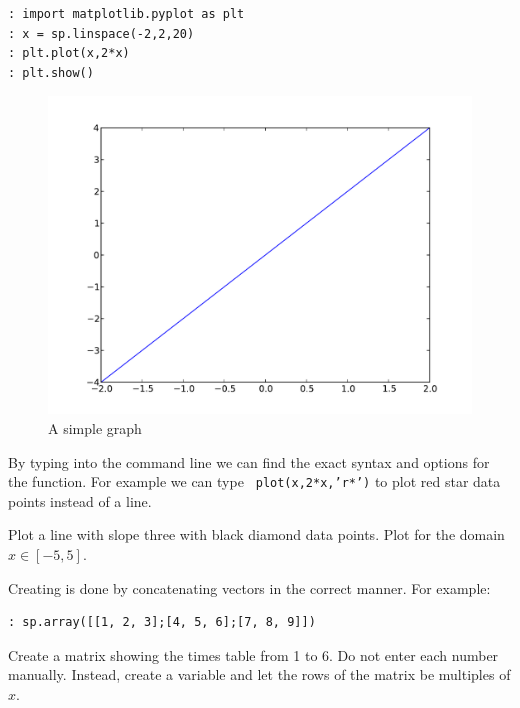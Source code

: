 \begin{lstlisting}
: import matplotlib.pyplot as plt
: x = sp.linspace(-2,2,20)
: plt.plot(x,2*x)
: plt.show()    
\end{lstlisting}

\begin{figure}
\begin{center}
        \includegraphics[scale=0.5]{./Figures/graph.pdf}
        \caption{A simple graph}
\end{center}
\end{figure}

By typing  into the command line we can find the exact syntax and
options for the  function. For example we can type {\tt
plot(x,2*x,'r*')} to plot red star data points instead of a line.

\begin{problem}
Plot a line with slope three with black diamond data points. Plot for the domain
$x \in [-5,5]$. 
\end{problem}

Creating is done by concatenating vectors in the correct manner. For example:

\begin{lstlisting}
: sp.array([[1, 2, 3];[4, 5, 6];[7, 8, 9]])
\end{lstlisting}

\begin{problem}
Create a matrix showing the times table from 1 to 6. Do not enter each number
manually. Instead, create a variable  and let the rows
of the matrix be multiples of $x$.
\end{problem}

